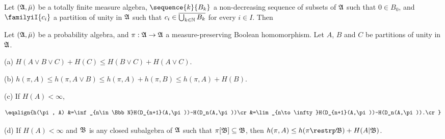 Let $(\frak A,\bar\mu)$ be a totally finite measure
algebra, $\sequence{k}{B_k}$ a non-decreasing sequence of subsets of
$\frak A$ such that $0\in B_0$, and $\familyiI{c_i}$ a partition of
unity in $\frak A$ such that $c_i\in\overline{\bigcup_{k\in\Bbb N}B_k}$
for every $i\in I$.   Then
     
     
     
     
Let $(\frak A,\bar\mu)$ be a probability algebra,
and $\pi:\frak A\to\frak A$ a measure-preserving Boolean homomorphism.
Let $A$, $B$ and $C$ be partitions of unity in $\frak A$.
     
(a) $H(A\vee B\vee C)+H(C)\le H(B\vee C)+H(A\vee C)$.
     
(b) $h(\pi,A)\le h(\pi,A\vee B)\le h(\pi,A)+h(\pi,B)\le h(\pi,A)+H(B)$.
     
(c) If $H(A)<\infty$,
     
$$\eqalign{h(\pi, A)
&=\inf_{n\in\Bbb N}H(D_{n+1}(A,\pi))-H(D_n(A,\pi))\cr
&=\lim_{n\to\infty}H(D_{n+1}(A,\pi))-H(D_n(A,\pi)).\cr}$$
     
(d) If $H(A)<\infty$ and $\frak B$ is any closed subalgebra of $\frak A$
such that $\pi[\frak B]\subseteq\frak B$, then
$h(\pi,A)\le h(\pi\restrp\frak B)+H(A|\frak B)$.
     
